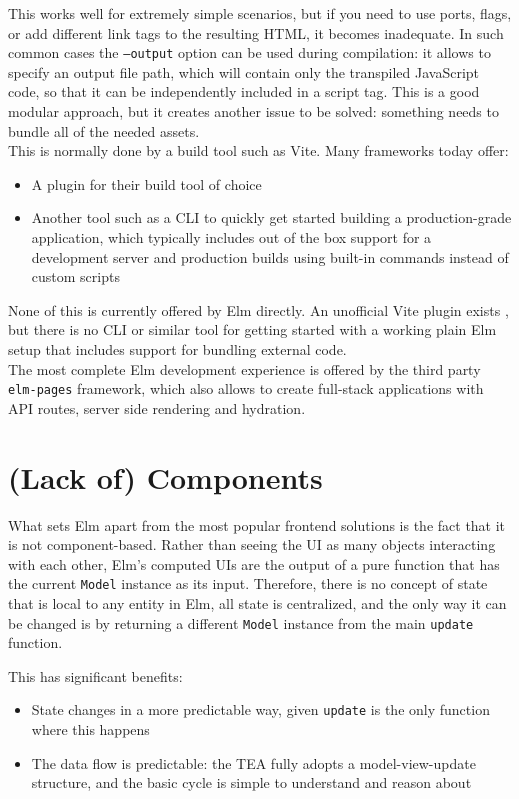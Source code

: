 This works well for extremely simple scenarios, but if you need to use ports, flags, or add different link tags to the resulting HTML, it becomes inadequate. In such common cases the \texttt{--output} option can be used during compilation: it allows to specify an output file path, which will contain only the transpiled JavaScript code, so that it can be independently included in a script tag. This is a good modular approach, but it creates another issue to be solved: something needs to bundle all of the needed assets.\\

This is normally done by a build tool such as Vite. Many frameworks today offer:
\begin{itemize}
    \item A plugin for their build tool of choice
    \item Another tool such as a CLI to quickly get started building a production-grade application, which typically includes out of the box support for a development server and production builds using built-in commands instead of custom scripts
\end{itemize}
None of this is currently offered by Elm directly. An unofficial Vite plugin exists \cite{hamasaki_hmskvite-plugin-elm_2024}, but there is no CLI or similar tool for getting started with a working plain Elm setup that includes support for bundling external code.\\

The most complete Elm development experience is offered by the third party \texttt{elm-pages} framework, which also allows to create full-stack applications with API routes, server side rendering and hydration. \cite{noauthor_what_nodate}

\section{(Lack of) Components}
What sets Elm apart from the most popular frontend solutions is the fact that it is not component-based. Rather than seeing the UI as many objects interacting with each other, Elm's computed UIs are the output of a pure function that has the current \texttt{Model} instance as its input. Therefore, there is no concept of state that is local to any entity in Elm, all state is centralized, and the only way it can be changed is by returning a different \texttt{Model} instance from the main \texttt{update} function.

This has significant benefits:
\begin{itemize}
    \item State changes in a more predictable way, given \texttt{update} is the only function where this happens
    \item The data flow is predictable: the TEA fully adopts a model-view-update structure, and the basic cycle is simple to understand and reason about
\end{itemize}

